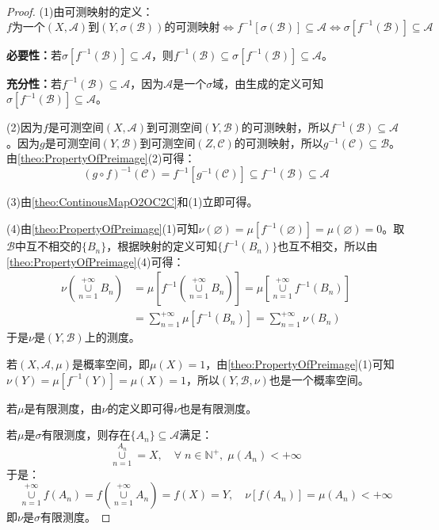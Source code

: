 \begin{proof}
	(1)由可测映射的定义：
	\begin{equation*}
		\text{$f$为一个$(X,\mathscr{A})$到$(Y,\sigma(\mathscr{B}))$的可测映射}
		\Leftrightarrow f^{-1}[\sigma(\mathscr{B})]\subseteq\mathscr{A}
		\Leftrightarrow
		\sigma[f^{-1}(\mathscr{B})]\subseteq\mathscr{A}
	\end{equation*}\par
	\textbf{必要性：}若$\sigma[f^{-1}(\mathscr{B})]\subseteq\mathscr{A}$，则$f^{-1}(\mathscr{B})\subseteq\sigma[f^{-1}(\mathscr{B})]\subseteq\mathscr{A}$。\par
	\textbf{充分性：}若$f^{-1}(\mathscr{B})\subseteq\mathscr{A}$，因为$\mathscr{A}$是一个$\sigma$域，由生成的定义可知$\sigma[f^{-1}(\mathscr{B})]\subseteq\mathscr{A}$。\par
	(2)因为$f$是可测空间$(X,\mathscr{A})$到可测空间$(Y,\mathscr{B})$的可测映射，所以$f^{-1}(\mathscr{B})\subseteq\mathscr{A}$。因为$g$是可测空间$(Y,\mathscr{B})$到可测空间$(Z,\mathscr{C})$的可测映射，所以$g^{-1}(\mathscr{C})\subseteq\mathscr{B}$。由\cref{theo:PropertyOfPreimage}(2)可得：
	\begin{equation*}
		(g\circ f)^{-1}(\mathscr{C})=f^{-1}[g^{-1}(\mathscr{C})]\subseteq f^{-1}(\mathscr{B})\subseteq\mathscr{A}
	\end{equation*}\par
	(3)由\cref{theo:ContinousMapO2OC2C}和(1)立即可得。\par
	(4)由\cref{theo:PropertyOfPreimage}(1)可知$\nu(\varnothing)=\mu[f^{-1}(\varnothing)]=\mu(\varnothing)=0$。取$\mathscr{B}$中互不相交的$\{B_n\}$，根据映射的定义可知$\{f^{-1}(B_n)\}$也互不相交，所以由\cref{theo:PropertyOfPreimage}(4)可得：
	\begin{align*}
		\nu\left(\underset{n=1}{\overset{+\infty}{\cup}}B_n\right)&=\mu\left[f^{-1}\left(\underset{n=1}{\overset{+\infty}{\cup}}B_n\right)\right]=\mu\left[\underset{n=1}{\overset{+\infty}{\cup}}f^{-1}(B_n)\right] \\
		&=\sum_{n=1}^{+\infty}\mu[f^{-1}(B_n)]=\sum_{n=1}^{+\infty}\nu(B_n)
	\end{align*}
	于是$\nu$是$(Y,\mathscr{B})$上的测度。\par
	若$(X,\mathscr{A},\mu)$是概率空间，即$\mu(X)=1$，由\cref{theo:PropertyOfPreimage}(1)可知$\nu(Y)=\mu[f^{-1}(Y)]=\mu(X)=1$，所以$(Y,\mathscr{B},\nu)$也是一个概率空间。\par
	若$\mu$是有限测度，由$\nu$的定义即可得$\nu$也是有限测度。\par
	若$\mu$是$\sigma$有限测度，则存在$\{A_n\}\subseteq\mathscr{A}$满足：
	\begin{equation*}
		\underset{n=1}{\overset{A_n}{\cup}}=X,\quad\forall\;n\in\mathbb{N}^+,\;\mu(A_n)<+\infty
	\end{equation*}
	于是：
	\begin{equation*}
		\underset{n=1}{\overset{+\infty}{\cup}}f(A_n)=f\left(\underset{n=1}{\overset{+\infty}{\cup}}A_n\right)=f(X)=Y,\quad\nu[f(A_n)]=\mu(A_n)<+\infty
	\end{equation*}
	即$\nu$是$\sigma$有限测度。
\end{proof}
